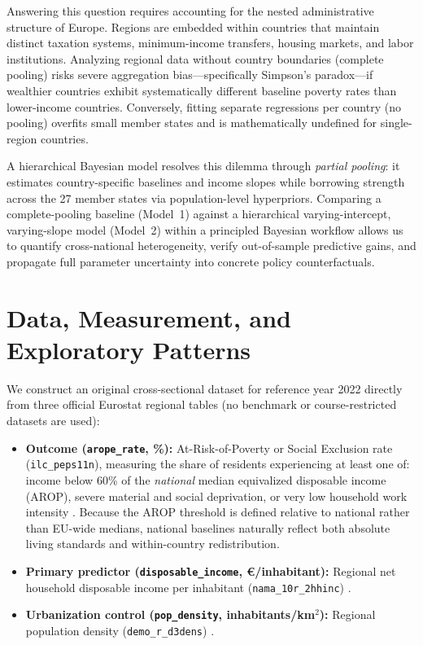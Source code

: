 \documentclass[11pt,a4paper]{article}
\begin{document}
Answering this question requires accounting for the nested administrative structure of Europe. Regions are embedded within countries that maintain distinct taxation systems, minimum-income transfers, housing markets, and labor institutions. Analyzing regional data without country boundaries (complete pooling) risks severe aggregation bias---specifically Simpson's paradox---if wealthier countries exhibit systematically different baseline poverty rates than lower-income countries. Conversely, fitting separate regressions per country (no pooling) overfits small member states and is mathematically undefined for single-region countries.

A hierarchical Bayesian model resolves this dilemma through \emph{partial pooling}: it estimates country-specific baselines and income slopes while borrowing strength across the 27 member states via population-level hyperpriors. Comparing a complete-pooling baseline (Model~1) against a hierarchical varying-intercept, varying-slope model (Model~2) within a principled Bayesian workflow \cite{gelman2013bda3,gabry2019visualization} allows us to quantify cross-national heterogeneity, verify out-of-sample predictive gains, and propagate full parameter uncertainty into concrete policy counterfactuals.

\section{Data, Measurement, and Exploratory Patterns}

We construct an original cross-sectional dataset for reference year 2022 directly from three official Eurostat regional tables (no benchmark or course-restricted datasets are used):
\begin{itemize}
    \item \textbf{Outcome (\texttt{arope\_rate}, \%):} At-Risk-of-Poverty or Social Exclusion rate (\texttt{ilc\_peps11n}), measuring the share of residents experiencing at least one of: income below 60\% of the \emph{national} median equivalized disposable income (AROP), severe material and social deprivation, or very low household work intensity \cite{eurostat2022arope}. Because the AROP threshold is defined relative to national rather than EU-wide medians, national baselines naturally reflect both absolute living standards and within-country redistribution.
    \item \textbf{Primary predictor (\texttt{disposable\_income}, \euro{}/inhabitant):} Regional net household disposable income per inhabitant (\texttt{nama\_10r\_2hhinc}) \cite{eurostat2022income}.
    \item \textbf{Urbanization control (\texttt{pop\_density}, inhabitants/km$^2$):} Regional population density (\texttt{demo\_r\_d3dens}) \cite{eurostat2022density}.
\end{itemize}
\end{document}
